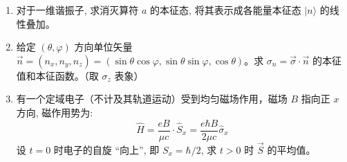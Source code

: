 \begin{enumerate}
\banswer{
	
}



\newpage
\item 
对于一维谐振子, 求消灭算符 $a$ 的本征态, 将其表示成各能量本征态 $|n\rangle$ 的线性叠加。

\banswer{
	
}

\item 
给定 $(\theta, \varphi)$ 方向单位矢量 $\vec{n}=\left(n_{x}, n_{y}, n_{z}\right)=(\sin \theta \cos \varphi, \sin \theta \sin \varphi, \cos \theta)$。求 $\sigma_{n}=\vec{\sigma} \cdot \vec{n}$ 的本征值和本征函数。（取 $\sigma_{z}$ 表象）


\banswer{
	
}

\item 
有一个定域电子（不计及其轨道运动）受到均匀磁场作用，磁场 $B$ 指向正 $x$ 方向, 磁作用势为:
\[
\hat{H}=\frac{e B}{\mu c} \cdot \hat{S}_{x}=\frac{e \hbar B}{2 \mu c} \hat{\sigma}_{x}
\]
设 $t=0$ 时电子的自旋 “向上”, 即 $S_{x}=\hbar / 2$, 求 $t>0$ 时 $\vec{S}$ 的平均值。

\banswer{
	
}


\end{enumerate}


